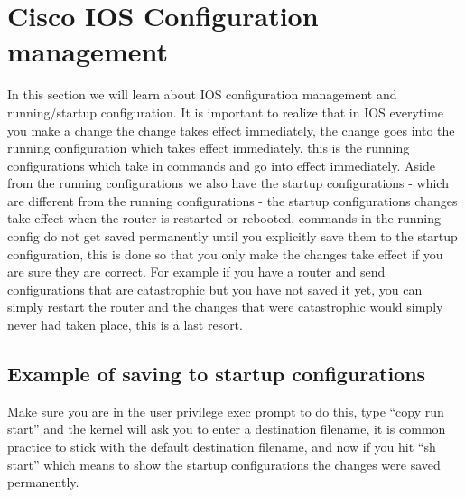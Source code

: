 \section{Cisco IOS Configuration management}
In this section we will learn about IOS configuration management and running/startup configuration. It is important to realize that in IOS everytime you make a change the change takes effect immediately, the change goes into the running configuration which takes effect immediately, this is the running configurations which take in commands and go into effect immediately. Aside from the running configurations we also have the startup configurations - which are different from the running configurations - the startup configurations changes take effect when the router is restarted or rebooted, commands in the running config do not get saved permanently until you explicitly save them to the startup configuration, this is done so that you only make the changes take effect if you are sure they are correct. For example if you have a router and send configurations that are catastrophic but you have not saved it yet, you can simply restart the router and the changes that were catastrophic would simply never had taken place, this is a last resort.

\subsection{Example of saving to startup configurations}
Make sure you are in the user privilege exec prompt to do this, type ``copy run start'' and the kernel will ask you to enter a destination filename, it is common practice to stick with the default destination filename, and now if you hit ``sh start'' which means to show the startup configurations the changes were saved permanently.

